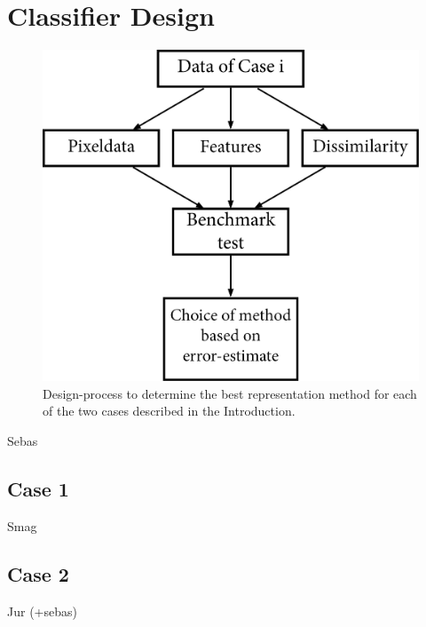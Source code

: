 \section{Classifier Design}
\label{sec:ClasDes}

\begin{figure}[H]
	\centering
	\includegraphics[scale=0.55]{images/Case_Design.jpg}
	\caption{Design-process to determine the best representation method for each of the two cases described in the Introduction.}
	\label{fig:case_design}
\end{figure}
Sebas

\subsection{Case 1}
\label{sec:Case1}
Smag

\subsection{Case 2}
\label{sec:Case2}
Jur (+sebas)